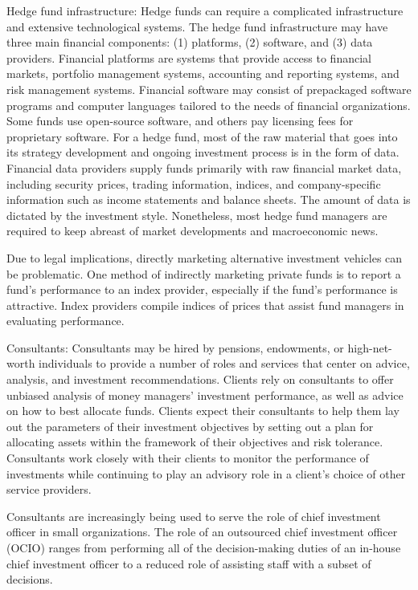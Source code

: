 \documentclass[11pt]{article}
\begin{document}
Hedge fund infrastructure: Hedge funds can require a complicated infrastructure and extensive technological systems. The hedge fund infrastructure may have three main financial components: (1) platforms, (2) software, and (3) data providers. Financial platforms are systems that provide access to financial markets, portfolio management systems, accounting and reporting systems, and risk management systems. Financial software may consist of prepackaged software programs and computer languages tailored to the needs of financial organizations. Some funds use open-source software, and others pay licensing fees for proprietary software. For a hedge fund, most of the raw material that goes into its strategy development and ongoing investment process is in the form of data. Financial data providers supply funds primarily with raw financial market data, including security prices, trading information, indices, and company-specific information such as income statements and balance sheets. The amount of data is dictated by the investment style. Nonetheless, most hedge fund managers are required to keep abreast of market developments and macroeconomic news.

Due to legal implications, directly marketing alternative investment vehicles can be problematic. One method of indirectly marketing private funds is to report a fund's performance to an index provider, especially if the fund's performance is attractive. Index providers compile indices of prices that assist fund managers in evaluating performance.

Consultants: Consultants may be hired by pensions, endowments, or high-net-worth individuals to provide a number of roles and services that center on advice, analysis, and investment recommendations. Clients rely on consultants to offer unbiased analysis of money managers' investment performance, as well as advice on how to best allocate funds. Clients expect their consultants to help them lay out the parameters of their investment objectives by setting out a plan for allocating assets within the framework of their objectives and risk tolerance. Consultants work closely with their clients to monitor the performance of investments while continuing to play an advisory role in a client's choice of other service providers.

Consultants are increasingly being used to serve the role of chief investment officer in small organizations. The role of an outsourced chief investment officer (OCIO) ranges from performing all of the decision-making duties of an in-house chief investment officer to a reduced role of assisting staff with a subset of decisions.
\end{document}
